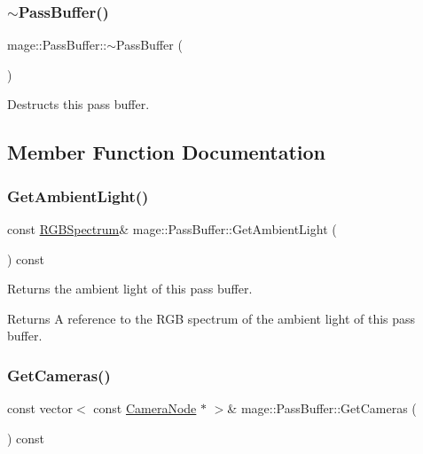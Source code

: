 \subsubsection{\texorpdfstring{$\sim$\+Pass\+Buffer()}{~PassBuffer()}}
{\footnotesize\ttfamily mage\+::\+Pass\+Buffer\+::$\sim$\+Pass\+Buffer (\begin{DoxyParamCaption}{ }\end{DoxyParamCaption})\hspace{0.3cm}{\ttfamily [default]}}

Destructs this pass buffer. 

\subsection{Member Function Documentation}
\hypertarget{structmage_1_1_pass_buffer_a91cbe609833b84c12113c9676b9de903}{}\label{structmage_1_1_pass_buffer_a91cbe609833b84c12113c9676b9de903} 
\subsubsection{\texorpdfstring{Get\+Ambient\+Light()}{GetAmbientLight()}}
{\footnotesize\ttfamily const \hyperlink{structmage_1_1_r_g_b_spectrum}{R\+G\+B\+Spectrum}\& mage\+::\+Pass\+Buffer\+::\+Get\+Ambient\+Light (\begin{DoxyParamCaption}{ }\end{DoxyParamCaption}) const\hspace{0.3cm}{\ttfamily [noexcept]}}

Returns the ambient light of this pass buffer.

\begin{DoxyReturn}{Returns}
A reference to the R\+GB spectrum of the ambient light of this pass buffer. 
\end{DoxyReturn}
\hypertarget{structmage_1_1_pass_buffer_a1b3745dab0028b470c76c695e55f6466}{}\label{structmage_1_1_pass_buffer_a1b3745dab0028b470c76c695e55f6466} 
\subsubsection{\texorpdfstring{Get\+Cameras()}{GetCameras()}}
{\footnotesize\ttfamily const vector$<$ const \hyperlink{classmage_1_1_camera_node}{Camera\+Node} $\ast$ $>$\& mage\+::\+Pass\+Buffer\+::\+Get\+Cameras (\begin{DoxyParamCaption}{ }\end{DoxyParamCaption}) const\hspace{0.3cm}{\ttfamily [noexcept]}}

